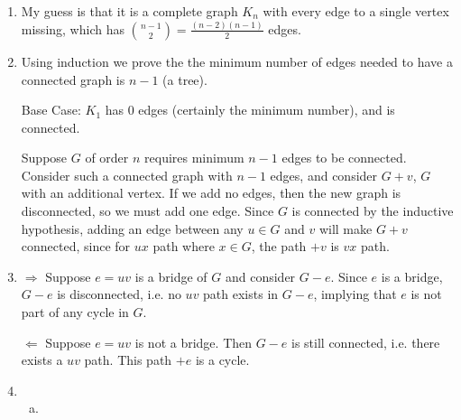 \documentclass[11pt]{article}
\begin{document}
\begin{enumerate}[1.]
    \item %
        My guess is that it is a complete graph $K_n$ with every edge to a single 
        vertex missing, which has $\binom{n-1}{2} = \frac{(n-2)(n-1)}{2}$ edges. 

    \item %
        Using induction we prove the the minimum number of edges needed to have 
        a connected graph is $n - 1$ (a tree). 

        Base Case: $K_1$ has $0$ edges (certainly the minimum number), and is connected.

        Suppose $G$ of order $n$ requires minimum ${n - 1}$ edges to be connected.
        Consider such a connected graph with $n - 1$ edges, and consider $G + {v}$,
        $G$ with an additional vertex. If we add no edges, then the new graph is 
        disconnected, so we must add one edge. Since $G$ is connected by the inductive
        hypothesis, adding an edge between any $u \in G$ and $v$ will make $G + {v}$ 
        connected, since for $ux$ path where $x \in G$, the path $+v$ is $vx$ path.

    \item %
        $\Rightarrow$ Suppose $e = uv$ is a bridge of $G$ and consider $G-e$. Since
        $e$ is a bridge, $G-e$ is disconnected, i.e. no $uv$ path exists in $G-e$,
        implying that $e$ is not part of any cycle in $G$. 


        $\Leftarrow$ Suppose $e = uv$ is not a bridge. Then $G - e$ is still connected, 
        i.e. there exists a $uv$ path. This path $+ e$ is a cycle.

    \item %
        \begin{enumerate}[a)]
            \item


\end{enumerate}
\end{enumerate}
\end{document}
